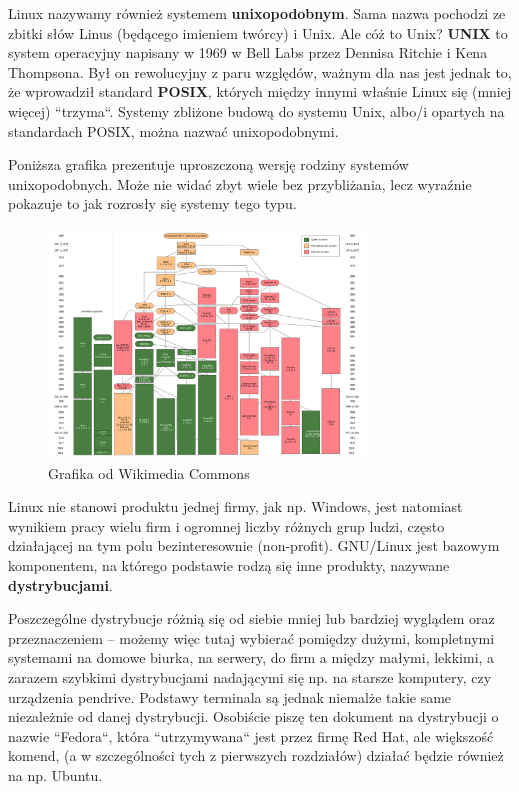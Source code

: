 \documentclass[11pt, a4paper]{article}
\begin{document}
Linux nazywamy również systemem \textbf{unixopodobnym}. Sama nazwa pochodzi ze zbitki słów Linus (będącego imieniem twórcy) i Unix. Ale cóż to Unix? \textbf{UNIX} to system operacyjny napisany w 1969 w Bell Labs przez Dennisa Ritchie i Kena Thompsona. Był on rewolucyjny z paru względów, ważnym dla nas jest jednak to, że wprowadził standard \textbf{POSIX}, których między innymi właśnie Linux się (mniej więcej) ``trzyma``. Systemy zbliżone budową do systemu Unix, albo/i opartych na standardach POSIX, można nazwać unixopodobnymi.

Poniższa grafika prezentuje uproszczoną wersję rodziny systemów unixopodobnych. Może nie widać zbyt wiele bez przybliżania, lecz wyraźnie pokazuje to jak rozrosły się systemy tego typu.

\begin{figure}[H]
    \centering
    \includegraphics[width=0.75\textwidth]{Unix_history-simple.svg.png}
    \caption{Grafika od Wikimedia Commons}
\end{figure}

Linux nie stanowi produktu jednej firmy, jak np. Windows, jest natomiast wynikiem pracy wielu firm i ogromnej liczby różnych grup ludzi, często działającej na tym polu bezinteresownie (non-profit). GNU/Linux jest bazowym komponentem, na którego podstawie rodzą się inne produkty, nazywane \textbf{dystrybucjami}.

Poszczególne dystrybucje różnią się od siebie mniej lub bardziej wyglądem oraz przeznaczeniem -- możemy więc tutaj wybierać pomiędzy dużymi, kompletnymi systemami na domowe biurka, na serwery, do firm a między małymi, lekkimi, a zarazem szybkimi dystrybucjami nadającymi się np. na starsze komputery, czy urządzenia pendrive. Podstawy terminala są jednak niemalże takie same niezależnie od danej dystrybucji. Osobiście piszę ten dokument na dystrybucji o nazwie ``Fedora``, która ``utrzymywana`` jest przez firmę Red Hat, ale większość komend, (a w szczególności tych z pierwszych rozdziałów) działać będzie również na np. Ubuntu.
\end{document}
